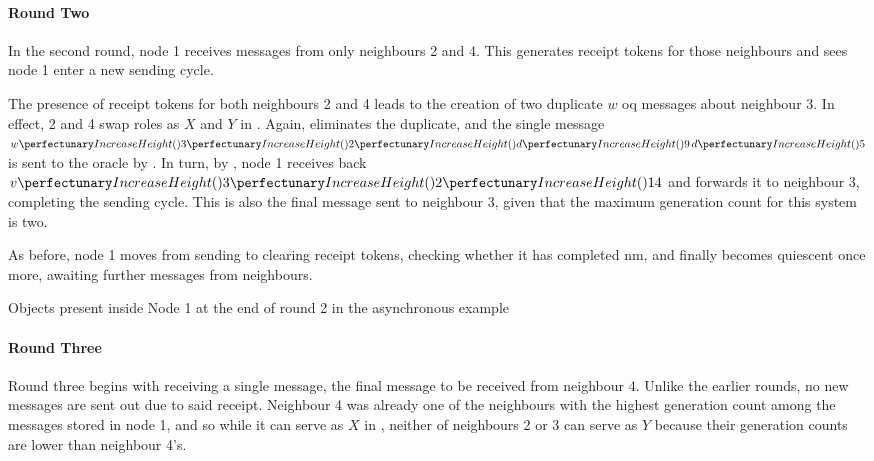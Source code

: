 \paragraph{Round Two}
In the second round, node 1 receives messages from only neighbours 2 and 4. This generates receipt tokens for those neighbours and sees node 1 enter a new sending cycle.

The presence of receipt tokens for both neighbours 2 and 4 leads to the creation of two duplicate \(w\) \gls{oq} messages about neighbour 3.  In effect, 2 and 4 swap roles as \(X\) and \(Y\) in .  Again,  eliminates the duplicate, and the single message \(\cpvw{3}{2}{\cpfunc{d}{9} \, \cpfunc{d}{5}}\) is sent to the oracle by .  In turn, by , node 1 receives back \(\cpvv{3}{2}{14}\) and forwards it to neighbour 3, completing the sending cycle.  This is also the final message sent to neighbour 3, given that the maximum generation count for this system is two.

As before, node 1 moves from sending to clearing receipt tokens, checking whether it has completed \gls{nm}, and finally becomes quiescent once more, awaiting further messages from neighbours.

\begin{cpobjectsfloat}
\begin{cpobjects}
\end{cpobjects}
\caption{\label{objs:nmp:ex2}Objects present inside Node 1 at the end of round 2 in the asynchronous  example}
\end{cpobjectsfloat}

\paragraph{Round Three}
Round three begins with receiving a single message, the final message to be received from neighbour 4.  Unlike the earlier rounds, no new messages are sent out due to said receipt.  Neighbour 4 was already one of the neighbours with the highest generation count among the messages stored in node 1, and so while it can serve as \(X\) in , neither of neighbours 2 or 3 can serve as \(Y\) because their generation counts are lower than neighbour 4's.

